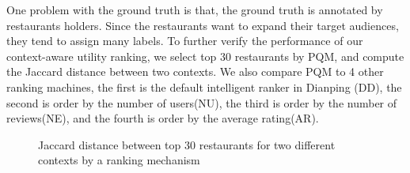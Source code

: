 \documentclass[preprint,12pt]{elsarticle}
\begin{document}
One problem with the ground truth is that, the ground truth is annotated by restaurants holders. Since the restaurants want to expand their target audiences, they tend to assign many labels. To further verify the performance of our context-aware utility ranking, we select top 30 restaurants by PQM, and compute the Jaccard distance between two contexts. We also compare PQM to 4 other ranking machines, the first is the default intelligent ranker in Dianping (DD), the second is order by the number of users(NU), the third is order by the number of reviews(NE), and the fourth is order by the average rating(AR).
\begin{figure}[!hbp]
\centering
{}
\hspace{0pt}
\vspace{0pt}
\hspace{0pt}
\vspace{0pt}
\hspace{0pt}
\vspace{0pt}
\hspace{0pt}
\vspace{0pt}
\caption{Jaccard distance between top 30 restaurants for two different contexts by a ranking mechanism}
\end{figure}
\end{document}
